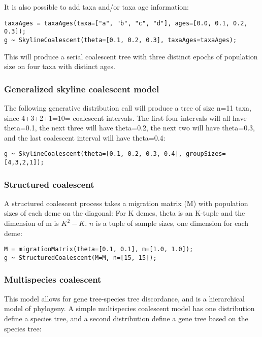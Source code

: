 \documentclass[oneside]{article}
\begin{document}
It is also possible to add taxa and/or taxa age information:

\begin{verbatim}
taxaAges = taxaAges(taxa=["a", "b", "c", "d"], ages=[0.0, 0.1, 0.2, 0.3]);
g ~ SkylineCoalescent(theta=[0.1, 0.2, 0.3], taxaAges=taxaAges);
\end{verbatim}

This will produce a serial coalescent tree with three distinct epochs
of population size on four taxa with distinct ages.

\subsubsection{Generalized skyline coalescent model}

The following generative distribution call will produce a tree of size
n=11 taxa, since 4+3+2+1=10= coalescent intervals.
The first four intervals will all have theta=0.1, the next three will
have theta=0.2, the next two will have theta=0.3, and the last
coalescent interval will have theta=0.4:

\begin{verbatim}
g ~ SkylineCoalescent(theta=[0.1, 0.2, 0.3, 0.4], groupSizes=[4,3,2,1]);
\end{verbatim}

\subsubsection{Structured coalescent}

A structured coalescent process takes a migration matrix (M) with
population sizes of each deme on the diagonal:
For K demes, theta is an K-tuple and the dimension of m is $K^2 -
K$. $n$ is a tuple of sample sizes, one dimension for each deme:

\begin{verbatim}
M = migrationMatrix(theta=[0.1, 0.1], m=[1.0, 1.0]);
g ~ StructuredCoalescent(M=M, n=[15, 15]);
\end{verbatim}

\subsubsection{Multispecies coalescent}

This model allows for gene tree-species tree discordance, and is a
hierarchical model of phylogeny.
A simple multispecies coalescent model has one distribution define a
species tree, and a second distribution define a gene tree based on
the species tree:
\end{document}
